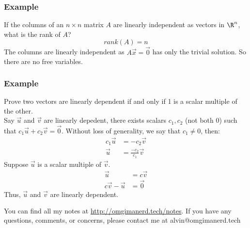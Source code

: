 \documentclass{math}
\begin{document}
\subsubsection*{Example}
If the columns of an \( n\times n \) matrix \( A \) are linearly independent
as vectors in \( \R^n \), what is the rank of \( A \)?
\[ rank(A) = n \]
The columns are linearly independent as \( A\vec{x} = \vec{0} \) has only the
trivial solution. So there are no free variables.

\subsubsection*{Example}
Prove two vectors are linearly dependent if and only if 1 is a scalar multiple
of the other. \\
Say \( \vec{u} \) and \( \vec{v} \) are linearly depedent, there exists scalars
\( c_1,c_2 \) (not both 0) such that \( c_1\vec{u}+c_2\vec{v} = \vec{0} \).
Without loss of generality, we say that \( c_1 \ne 0 \), then:
\begin{align*}
  c_1\vec{u} &= -c_2\vec{v} \\
  \vec{u} &= \frac{-c_2}{c_1}\vec{v}
\end{align*}
Suppose \( \vec{u} \) is a scalar multiple of \( \vec{v} \).
\begin{align*}
  \vec{u} &= c\vec{v} \\
  c\vec{v}-\vec{u} &= \vec{0}
\end{align*}
Thus, \( \vec{u} \) and \( \vec{v} \) are linearly dependent.

\begin{center}
  You can find all my notes at \url{http://omgimanerd.tech/notes}. If you have
  any questions, comments, or concerns, please contact me at
  alvin@omgimanerd.tech
\end{center}
\end{document}
